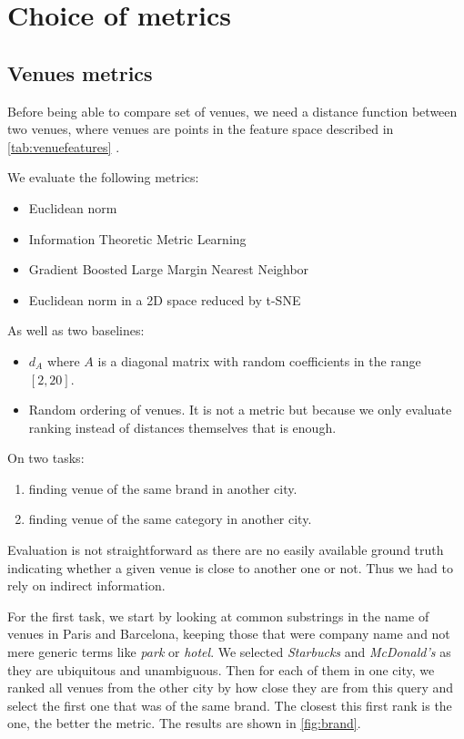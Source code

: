 \chapter{Choice of metrics}
\label{chap:metric}

\section{Venues metrics}

Before being able to compare set of venues, we need a distance function between
two venues, where venues are points in the feature space described in
\autoref{tab:venuefeatures} .

We evaluate the following metrics:
\begin{itemize}
	\item Euclidean norm
	\item Information Theoretic Metric Learning
	\item Gradient Boosted Large Margin Nearest Neighbor
	\item Euclidean norm in a 2D space reduced by t-SNE
\end{itemize}		
As well as two baselines:
\begin{itemize}
	\item $d_A$ where $A$ is a diagonal matrix with random coefficients in
		the range $[2, 20]$.
	\item Random ordering of venues. It is not a metric but because we
		only evaluate ranking instead of distances themselves that is
		enough.
\end{itemize}		
On two tasks:
\begin{enumerate}
	\item finding venue of the same brand in another city.
	\item finding venue of the same category in another city.
\end{enumerate}		

Evaluation is not straightforward as there are no easily available ground truth
indicating whether a given venue is close to another one or not. Thus we had to
rely on indirect information.

For the first task, we start by looking at common substrings in the name of venues
in Paris and Barcelona, keeping those that were company name and not mere
generic terms like \emph{park} or \emph{hotel}. We selected \emph{Starbucks} and
\emph{McDonald's} as they are ubiquitous and unambiguous. Then for each of
them in one city, we ranked all venues from the other city by how close they
are from this query and select the first one that was of the same brand. The
closest this first rank is the one, the better the metric. The results are
shown in \autoref{fig:brand}.

